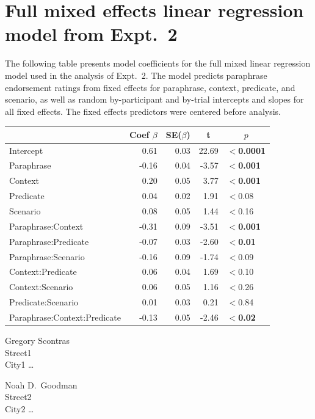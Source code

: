 \documentclass[linguex]{sp}
\begin{document}
\section{Full mixed effects linear regression model from Expt.~2}\label{expt2results}

The following table presents model coefficients for the full mixed linear regression model used in the analysis of Expt.~2. The model predicts paraphrase endorsement ratings from fixed effects for paraphrase, context, predicate, and scenario, as well as random by-participant and by-trial intercepts and slopes for all fixed effects. The fixed effects predictors were centered before analysis.

\begin{center}

\begin{tabular}{lrrrl}\toprule
	&	Coef $\beta$	&	SE($\beta$)	&	\multicolumn{1}{c}{ \textbf{t}}	&	\multicolumn{1}{c}{$p$}\\ \midrule
Intercept	&	0.61	&	0.03	&	22.69	&	\textbf{$<$0.0001}\\
Paraphrase	&	-0.16	&	0.04	&	-3.57	&	\textbf{$<$0.001}\\
Context		&	0.20	&	0.05	&	3.77	&	\textbf{$<$0.001}\\
Predicate	&	0.04	&	0.02	&	1.91	&	$<$0.08\\
Scenario	&	0.08	&	0.05	&	1.44	&	$<$0.16\\
Paraphrase:Context		&	-0.31	&	0.09	&	-3.51	&	\textbf{$<$0.001}\\
Paraphrase:Predicate	&	-0.07	&	0.03	&	-2.60	&	\textbf{$<$0.01}\\
Paraphrase:Scenario	&	-0.16	&	0.09	&	-1.74	&	$<$0.09\\
Context:Predicate	&	0.06	&	0.04	&	1.69	&	$<$0.10\\
Context:Scenario	&	0.06	&	0.05	&	1.16	&	$<$0.26\\
Predicate:Scenario	&	0.01	&	0.03	&	0.21	&	$<$0.84\\
Paraphrase:Context:Predicate	&	-0.13	&	0.05	&	-2.46	&	\textbf{$<$0.02}\\
\bottomrule
\end{tabular}

\end{center}


%


\begin{addresses}
	\begin{address}
		Gregory Scontras \\
		Street1 \\
		City1 \ldots \\
	\end{address}
	\begin{address}
		Noah D.~Goodman \\
		Street2 \\
		City2 \dots \\
		\email{author2@email}
	\end{address}
\end{addresses}
\end{document}
